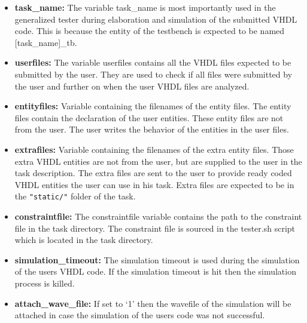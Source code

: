 \begin{itemize}
\item {\bf task\_name:} The variable task\_name is most importantly used in the generalized tester during elaboration and simulation of the submitted VHDL code. This is because the entity of the testbench is expected to be named \mbox{[task\_name]\_tb}.
\item {\bf userfiles:} The variable userfiles contains all the VHDL files expected to be submitted by the user. They are used to check if all files were submitted by the user and further on when the user VHDL files are analyzed.
\item {\bf entityfiles:} Variable containing the filenames of the entity files. The entity files contain the declaration of the user entities. These entity files are not from the user. The user writes the behavior of the entities in the user files.
\item {\bf extrafiles:} Variable containing the filenames of the extra entity files. Those extra VHDL entities are not
from the user, but are supplied to the user in the task description. The extra files are sent to the user to provide
ready coded VHDL entities the user can use in his task. Extra files are expected to be in the {\tt "static/"} folder of
the task.
\item {\bf constraintfile:} The constraintfile variable contains the path to the constraint file in the task directory. The constraint file is sourced in the tester.sh script which is located in the task directory.
\item {\bf simulation\_timeout:} The simulation timeout is used during the simulation of the users VHDL code. If the simulation timeout is hit then the simulation process is killed.
\item {\bf attach\_wave\_file:} If set to `1' then the wavefile of the simulation will be attached in case the simulation of the users code was not successful.
\end{itemize}



